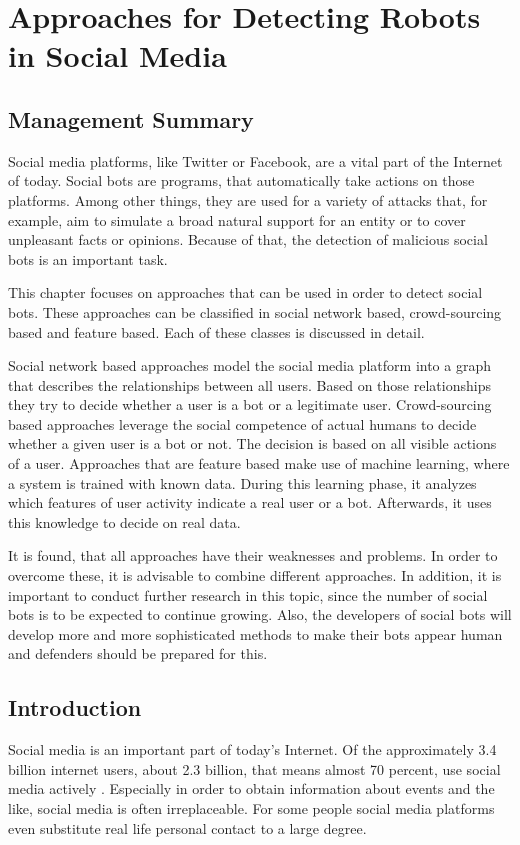 \newpage
\chapter{Approaches for Detecting Robots \\ in Social Media}

\section*{Management Summary}
Social media platforms, like Twitter or Facebook, are a vital part of the Internet of today. Social bots are programs, that automatically take actions on those platforms. Among other things, they are used for a variety of attacks that, for example, aim to simulate a broad natural support for an entity or to cover unpleasant facts or opinions. Because of that, the detection of malicious social bots is an important task.

This chapter focuses on approaches that can be used in order to detect social bots. These approaches can be classified in social network based, crowd-sourcing based and feature based. Each of these classes is discussed in detail.

Social network based approaches model the social media platform into a graph that describes the relationships between all users. Based on those relationships they try to decide whether a user is a bot or a legitimate user.
Crowd-sourcing based approaches leverage the social competence of actual humans to decide whether a given user is a bot or not. The decision is based on all visible actions of a user. 
Approaches that are feature based make use of machine learning, where a system is trained with known data. During this learning phase, it analyzes which features of user activity indicate a real user or a bot. Afterwards, it uses this knowledge to decide on real data.

It is found, that all approaches have their weaknesses and problems. In order to overcome these, it is advisable to combine different approaches. In addition, it is important to conduct further research in this topic, since the number of social bots is to be expected to continue growing. Also, the developers of social bots will develop more and more sophisticated methods to make their bots appear human and defenders should be prepared for this. 


\section{Introduction}
Social media is an important part of today's Internet.  Of the approximately 3.4 billion internet users, about 2.3 billion, that means almost 70 percent, use social media actively \cite{insight}. Especially in order to obtain information about events and the like, social media is often irreplaceable.  For some people social media platforms even substitute real life personal contact to a large degree.

